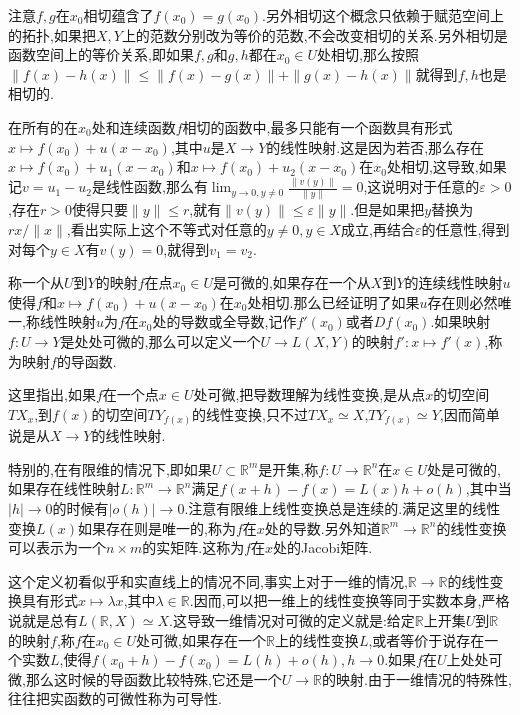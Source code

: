 注意$f,g$在$x_0$相切蕴含了$f(x_0)=g(x_0)$.另外相切这个概念只依赖于赋范空间上的拓扑,如果把$X,Y$上的范数分别改为等价的范数,不会改变相切的关系.另外相切是函数空间上的等价关系,即如果$f,g$和$g,h$都在$x_0\in U$处相切,那么按照$\|f(x)-h(x)\|\le\|f(x)-g(x)\|+\|g(x)-h(x)\|$就得到$f,h$也是相切的.

在所有的在$x_0$处和连续函数$f$相切的函数中,最多只能有一个函数具有形式$x\mapsto f(x_0)+u(x-x_0)$,其中$u$是$X\to Y$的线性映射.这是因为若否,那么存在$x\mapsto f(x_0)+u_1(x-x_0)$和$x\mapsto f(x_0)+u_2(x-x_0)$在$x_0$处相切,这导致,如果记$v=u_1-u_2$是线性函数,那么有$\lim_{y\to0,y\not=0}\frac{\|v(y)\|}{\|y\|}=0$,这说明对于任意的$\varepsilon>0$,存在$r>0$使得只要$\|y\|\le r$,就有$\|v(y)\|\le\varepsilon\|y\|$.但是如果把$y$替换为$rx/\|x\|$,看出实际上这个不等式对任意的$y\not=0,y\in X$成立,再结合$\varepsilon$的任意性,得到对每个$y\in X$有$v(y)=0$,就得到$v_1=v_2$.

称一个从$U$到$Y$的映射$f$在点$x_0\in U$是可微的,如果存在一个从$X$到$Y$的连续线性映射$u$使得$f$和$x\mapsto f(x_0)+u(x-x_0)$在$x_0$处相切.那么已经证明了如果$u$存在则必然唯一,称线性映射$u$为$f$在$x_0$处的导数或全导数,记作$f'(x_0)$或者$Df(x_0)$.如果映射$f:U\to Y$是处处可微的,那么可以定义一个$U\to L(X,Y)$的映射$f':x\mapsto f'(x)$,称为映射$f$的导函数.

这里指出,如果$f$在一个点$x\in U$处可微,把导数理解为线性变换,是从点$x$的切空间$TX_x$,到$f(x)$的切空间$TY_{f(x)}$的线性变换,只不过$TX_x\simeq X$,$TY_{f(x)}\simeq Y$,因而简单说是从$X\to Y$的线性映射.

特别的,在有限维的情况下,即如果$U\subset\mathbb{R}^m$是开集,称$f:U\to\mathbb{R}^n$在$x\in U$处是可微的,如果存在线性映射$L:\mathbb{R}^m\to\mathbb{R}^n$满足$f(x+h)-f(x)=L(x)h+o(h)$,其中当$|h|\to0$的时候有$|o(h)|\to0$.注意有限维上线性变换总是连续的.满足这里的线性变换$L(x)$如果存在则是唯一的,称为$f$在$x$处的导数.另外知道$\mathbb{R}^m\to\mathbb{R}^n$的线性变换可以表示为一个$n\times m$的实矩阵.这称为$f$在$x$处的Jacobi矩阵.

这个定义初看似乎和实直线上的情况不同,事实上对于一维的情况,$\mathbb{R}\to\mathbb{R}$的线性变换具有形式$x\mapsto\lambda x$,其中$\lambda\in\mathbb{R}$.因而,可以把一维上的线性变换等同于实数本身,严格说就是总有$L(\mathbb{R},X)\simeq X$.这导致一维情况对可微的定义就是:给定$\mathbb{R}$上开集$U$到$\mathbb{R}$的映射$f$,称$f$在$x_0\in U$处可微,如果存在一个$\mathbb{R}$上的线性变换$L$,或者等价于说存在一个实数$L$,使得$f(x_0+h)-f(x_0)=L(h)+o(h),h\to0$.如果$f$在$U$上处处可微,那么这时候的导函数比较特殊,它还是一个$U\to\mathbb{R}$的映射.由于一维情况的特殊性,往往把实函数的可微性称为可导性.

